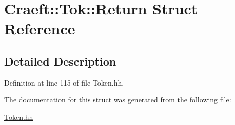 \hypertarget{struct_craeft_1_1_tok_1_1_return}{}\section{Craeft\+:\+:Tok\+:\+:Return Struct Reference}
\label{struct_craeft_1_1_tok_1_1_return}


\subsection{Detailed Description}


Definition at line 115 of file Token.\+hh.



The documentation for this struct was generated from the following file\+:\begin{DoxyCompactItemize}
\item 
\hyperlink{_token_8hh}{Token.\+hh}\end{DoxyCompactItemize}
